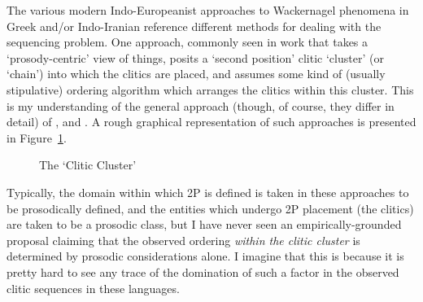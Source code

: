 \documentclass[output=paper,
modfonts
]{LSP/langsci}
\begin{document}
The various modern Indo-Europeanist approaches to Wackernagel phenomena in Greek and/or Indo-Iranian
reference different methods for dealing with the sequencing problem. One approach, commonly seen
in work that takes a `prosody-centric' view of things, posits a `second position' clitic
`cluster' (or `chain') into which the clitics are placed, and assumes some kind of (usually 
stipulative) ordering algorithm which arranges the clitics within this cluster. This is
my understanding of the general approach (though, of course, they differ in detail)
of \citet{keydana2011}, \citet{lowe2014} and \citet{goldstein2016}. A rough graphical representation of such
approaches is presented in Figure~\ref{figure1}.

\begin{figure}%
\begin{center}
\end{center}
\caption{The `Clitic Cluster'}\label{figure1}
\end{figure}

Typically, the domain within which 2P is defined is taken in these approaches to be
prosodically defined, and the entities which undergo 2P placement (the clitics) are taken to be
a prosodic class, but I have never seen an empirically-grounded proposal claiming 
that the observed ordering \textit{within
the clitic cluster} is determined by prosodic considerations alone. I imagine that this is because it is pretty hard
to see any trace of the domination of such a factor in the observed clitic sequences in these languages.
\end{document}
